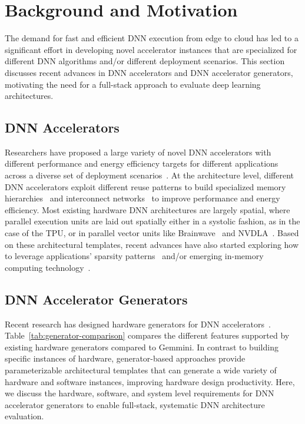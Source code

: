\section{Background and Motivation}\label{sec:motivation}

The demand for fast and efficient DNN execution from edge to cloud has led to a significant effort in developing novel accelerator instances that are
specialized for different DNN algorithms and/or different deployment scenarios.
This section discusses recent advances in DNN accelerators and
DNN accelerator generators, motivating the need for a full-stack approach to
evaluate deep learning architectures.

\subsection{DNN Accelerators}

Researchers have proposed a large variety of novel DNN accelerators with different performance and energy efficiency targets for different applications across a diverse set of deployment scenarios~\cite{eyeriss2,shidiannao,scaledeep,moreau2018}. At the architecture level, different DNN accelerators exploit different reuse patterns to build specialized memory hierarchies~\cite{interstellar-asplos2020} and interconnect networks~\cite{maeri-asplos2018} to improve performance and energy efficiency. Most existing hardware DNN architectures are largely spatial, where parallel execution units are laid out spatially either in a systolic fashion, as in the case of the TPU, or in parallel vector units like Brainwave~\cite{brainwave-isca-2018} and NVDLA~\cite{nvdla-hotchips}. Based on these architectural templates, recent advances have also started exploring how to leverage applications' sparsity patterns~\cite{sigma-hpca2020,sparse-tpu,sparse-train} and/or emerging in-memory computing technology~\cite{pipelayer,algo-hardware-codesign-for-in-memory}.

\subsection{DNN Accelerator Generators}
Recent research has designed hardware generators %
for DNN accelerators~\cite{nvdla-hotchips,moreau2018,polysa,venkatesan2019magnet,dnnweaver,maeri-asplos2018}.
Table~\ref{tab:generator-comparison} compares the different features supported by existing hardware generators compared to Gemmini.
In contrast to building specific instances of hardware, generator-based
approaches provide parameterizable architectural
templates that can generate a wide variety of hardware and software instances, improving
hardware design productivity.
Here, we discuss the hardware, software, and system level requirements for DNN
accelerator generators to enable full-stack, systematic DNN architecture
evaluation.

